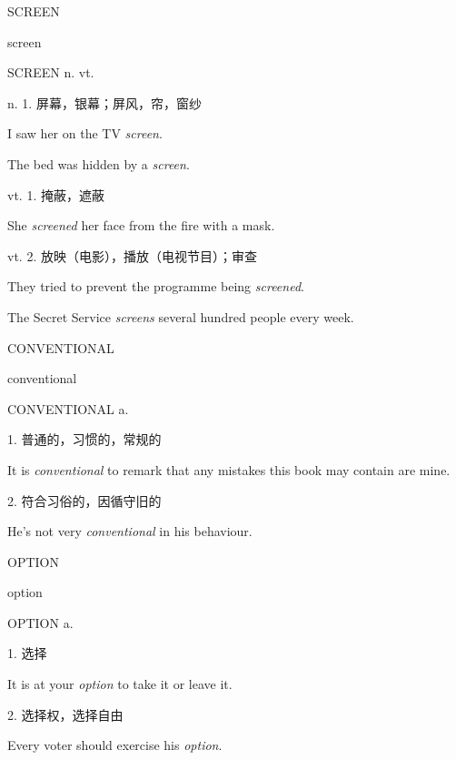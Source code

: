 \begin{flashcard}{
SCREEN

screen
}
\begin{center}
SCREEN n. vt. 
\end{center}
n. 1. 屏幕，银幕；屏风，帘，窗纱

I saw her on the TV \textit{screen}.

The bed was hidden by a \textit{screen}.

vt. 1. 掩蔽，遮蔽

She \textit{screened} her face from the fire with a mask.

vt. 2. 放映（电影），播放（电视节目）；审查

They tried to prevent the programme being \textit{screened}.

The Secret Service \textit{screens} several hundred people every week.

\end{flashcard}
\begin{flashcard}{
CONVENTIONAL

conventional
}
\begin{center}
CONVENTIONAL a. 
\end{center}
1. 普通的，习惯的，常规的

It is \textit{conventional} to remark that any mistakes this book may contain are mine.

2. 符合习俗的，因循守旧的

He's not very \textit{conventional} in his behaviour.

\end{flashcard}
\begin{flashcard}{
OPTION

option
}
\begin{center}
OPTION a. 
\end{center}
1. 选择

It is at your \textit{option} to take it or leave it.

2. 选择权，选择自由

Every voter should exercise his \textit{option}.

\end{flashcard}
